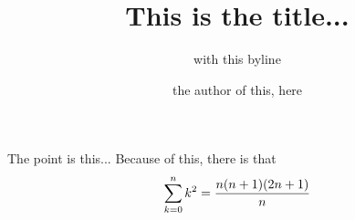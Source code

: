 \documentclass[pdf]{beamer}
\title{This is the title...}
\subtitle{with this byline}
\author{the author of this, here}
\begin{document}
\begin{frame}
  \titlepage
\end{frame}

\begin{frame}{The point is this...}
  Because of this, there is that
$$\sum_{k=0}^{n}{k^2}={n(n+1)(2n+1)\over n}$$
\end{frame}
\end{document}
